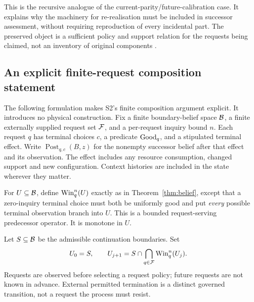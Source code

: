 This is the recursive analogue of the current-parity/future-calibration case. It explains why the machinery for re-realisation must be included in successor assessment, without requiring reproduction of every incidental part. The preserved object is a sufficient policy and support relation for the requests being claimed, not an inventory of original components \cite[\S\S6,8]{S2}\cite[\S12]{S3}.

\subsection{An explicit finite-request composition statement}

The following formulation makes S2's finite composition argument explicit. It introduces no physical construction. Fix a finite boundary-belief space \(\mathcal B\), a finite externally supplied request set \(\mathcal F\), and a per-request inquiry bound \(n\). Each request \(q\) has terminal choices \(c\), a predicate \(\operatorname{Good}_q\), and a stipulated terminal effect. Write \(\operatorname{Post}_{q,c}(B,z)\) for the nonempty successor belief after that effect and its observation. The effect includes any resource consumption, changed support and new configuration. Context histories are included in the state wherever they matter.

For \(U\subseteq\mathcal B\), define \(\operatorname{Win}_q^n(U)\) exactly as in Theorem~\ref{thm:belief}, except that a zero-inquiry terminal choice must both be uniformly good and put \emph{every} possible terminal observation branch into \(U\). This is a bounded request-serving predecessor operator. It is monotone in \(U\).

Let \(S\subseteq\mathcal B\) be the admissible continuation boundaries. Set
\begin{equation}
U_0=S,\qquad
U_{j+1}=S\cap\bigcap_{q\in\mathcal F}\operatorname{Win}_q^n(U_j).
\label{eq:recursivefamily}
\end{equation}
Requests are observed before selecting a request policy; future requests are not known in advance. External permitted termination is a distinct governed transition, not a request the process must resist.


